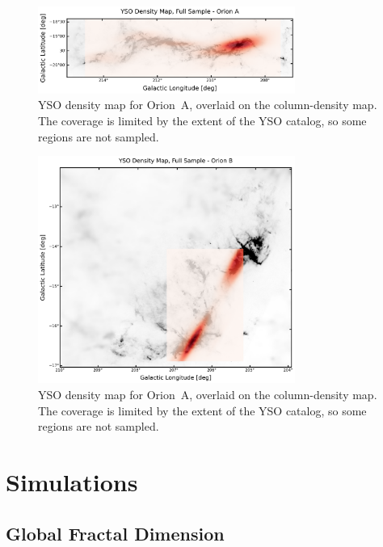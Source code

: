 \begin{figure}[t]
    \centering
    \includegraphics[width=0.75\textwidth]{figures/YSOs_density_Orion_A.png}
    \caption{YSO density map for Orion~A, overlaid on the column-density map. The coverage is limited by the extent of the YSO catalog, so some regions are not sampled.}
    \label{fig:YSOs_density_Map_A}
\end{figure}

\begin{figure}[t]
    \centering
    \includegraphics[width=0.75\textwidth]{figures/YSOs_density_Orion_B.png}
    \caption{YSO density map for Orion~A, overlaid on the column-density map. The coverage is limited by the extent of the YSO catalog, so some regions are not sampled.}
    \label{fig:YSOs_density_Map_B}
\end{figure}

\section{Simulations}

\subsection{Global Fractal Dimension}

